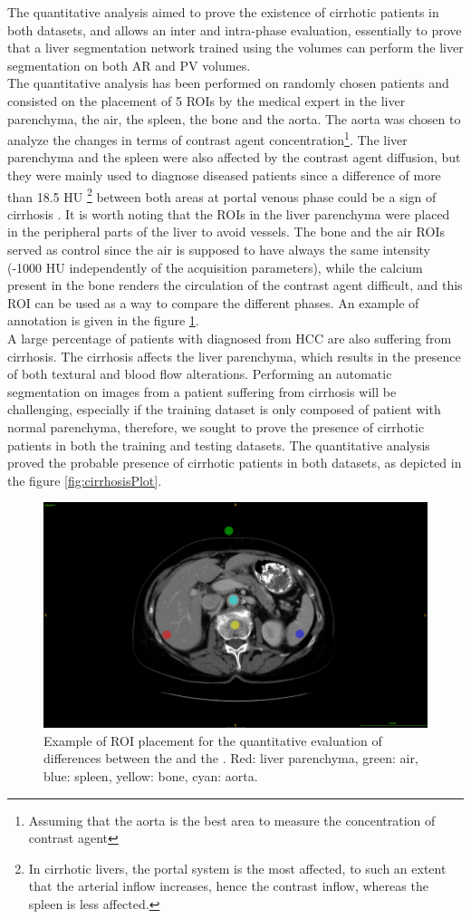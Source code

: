 The quantitative analysis aimed to prove the existence of cirrhotic patients in both datasets, and allows an inter and intra-phase evaluation, essentially to prove that a liver segmentation network trained using the \textbf{} volumes can perform the liver segmentation on both AR and PV volumes. \\
The quantitative analysis has been performed on randomly chosen patients and consisted on the placement of 5 ROIs by the medical expert in the liver parenchyma, the air, the spleen, the bone and the aorta. The aorta was chosen to analyze the changes in terms of contrast agent concentration\footnote{Assuming that the aorta is the best area to measure the concentration of contrast agent}. The liver parenchyma and the spleen were also affected by the contrast agent diffusion, but they were mainly used to diagnose diseased patients since a difference of more than 18.5 HU \footnote{In cirrhotic livers, the portal system is the most affected, to such an extent that the arterial inflow increases, hence the contrast inflow, whereas the spleen is less affected.} between both areas at portal venous phase could be a sign of cirrhosis \cite{Wells2016}. It is worth noting that the ROIs in the liver parenchyma were placed in the peripheral parts of the liver to avoid vessels. The bone and the air ROIs served as control since the air is supposed to have always the same intensity (-1000 HU independently of the acquisition parameters), while the calcium present in the bone renders the circulation of the contrast agent difficult, and this ROI can be used as a way to compare the different phases. An example of annotation is given in the figure \ref{fig:roiPlacement}. \\
A large percentage of patients with diagnosed from HCC are also suffering from cirrhosis. The cirrhosis affects the liver parenchyma, which results in the presence of both textural and blood flow alterations. Performing an automatic segmentation on images from a patient suffering from cirrhosis will be challenging, especially if the training dataset is only composed of patient with normal parenchyma, therefore, we sought to prove the presence of cirrhotic patients in both the training and testing datasets. The quantitative analysis proved the probable presence of cirrhotic patients in both datasets, as depicted in the figure \ref{fig:cirrhosisPlot}.
\begin{figure}[!ht]
	\centering
	\includegraphics[width=0.6\linewidth]{../Contributions/images/Resizejuan_Roi_Example}
	\caption{Example of ROI placement for the quantitative evaluation of differences between the \textbf{} and the \textbf{}. Red: liver parenchyma, green: air, blue: spleen, yellow: bone, cyan: aorta.}
	\label{fig:roiPlacement}
\end{figure}
